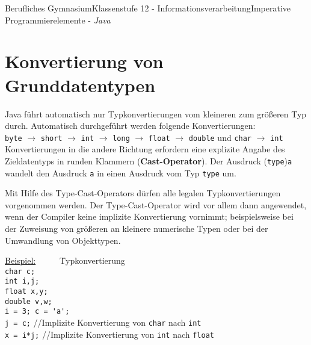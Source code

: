 \documentclass[oneside,openany,headings=optiontotoc,11pt,numbers=noenddot]{article}
\begin{document}
\begin{worksheet}{Berufliches Gymnasium}{Klassenstufe 12 - Informationsverarbeitung}{Imperative Programmierelemente - \textit{Java}}
		\section*{Konvertierung von Grunddatentypen}
		Java führt automatisch nur Typkonvertierungen vom \grqq{}kleineren\grqq{} zum \grqq{}größeren\grqq{} Typ durch. Automatisch durchgeführt werden folgende Konvertierungen:\\
		\lstinline[style=JavaInputStyle]|byte| $\rightarrow$ \lstinline[style=JavaInputStyle]|short| $\rightarrow$ \lstinline[style=JavaInputStyle]|int| $\rightarrow$ \lstinline[style=JavaInputStyle]|long| $\rightarrow$ \lstinline[style=JavaInputStyle]|float| $\rightarrow$ \lstinline[style=JavaInputStyle]|double| und \lstinline[style=JavaInputStyle]|char| $\rightarrow$ \lstinline[style=JavaInputStyle]|int|\\
		Konvertierungen in die andere Richtung erfordern eine explizite Angabe des Zieldatentyps in runden Klammern (\textbf{Cast-Operator}). Der Ausdruck (\lstinline[style=javaInputStyle]|type|)\lstinline[style=javaInputStyle]|a| wandelt den Ausdruck \lstinline[style=javaInputStyle]|a| in einen Ausdruck vom Typ \lstinline[style=javaInputStyle]|type| um.\\
		\par\noindent
		Mit Hilfe des Type-Cast-Operators dürfen alle legalen Typkonvertierungen vorgenommen werden. Der Type-Cast-Operator wird vor allem dann angewendet, wenn der Compiler keine implizite Konvertierung vornimmt; beispielsweise bei der Zuweisung von größeren an kleinere numerische Typen oder bei der Umwandlung von Objekttypen.\\
		\par\noindent
		\begin{tabbing}
			\underline{Beispiel:}~~~~~ \= Typkonvertierung\\
			\lstinline[style=JavaInputStyle]|char c;|\\
			\lstinline[style=JavaInputStyle]|int i,j;|\\
			\lstinline[style=JavaInputStyle]|float x,y;|\\
			\lstinline[style=JavaInputStyle]|double v,w;|\\
			\lstinline[style=JavaInputStyle]|i = 3; c = 'a';|\\
			\lstinline[style=JavaInputStyle]|j = c;| \> //Implizite Konvertierung von \lstinline[style=JavaInputStyle]|char| nach \lstinline[style=JavaInputStyle]|int|\\
			\lstinline[style=JavaInputStyle]|x = i*j;| \> //Implizite Konvertierung von \lstinline[style=JavaInputStyle]|int|  nach \lstinline[style=JavaInputStyle]|float|\\

\end{tabbing}
\end{worksheet}
\end{document}
